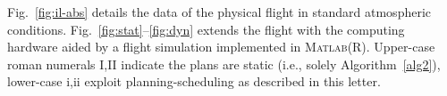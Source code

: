 \documentclass[letterpaper,10pt,journal,twoside]{IEEEtran}
\newcommand{\figpath}{./figures}
\theoremstyle{definition}
\begin{document}
Fig.~\ref{fig:il-abs} details the data of the physical flight  
in standard atmospheric conditions. 
Fig.~\ref{fig:stat}{\color{blue}--\ref{fig:dyn}} extends the flight with the computing hardware aided by a flight simulation implemented in \textsc{Matlab}\hspace{.5ex}(R). 
Upper-case roman numerals I,II indicate the plans are static (i.e., solely Algorithm~\ref{alg2}), lower-case i,ii exploit planning-scheduling as described in this letter.


%  
%  
%  
\end{document}
